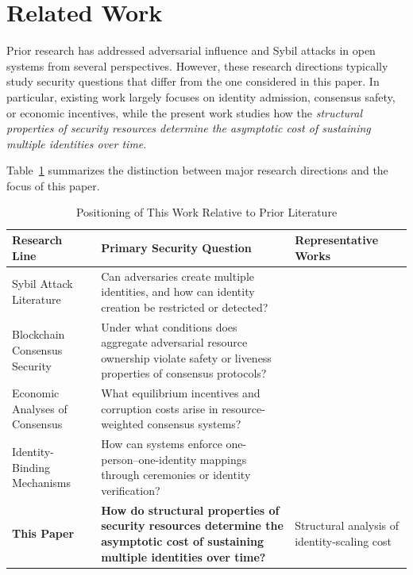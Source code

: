 \documentclass[journal]{IEEEtran}
\begin{document}
	\section{Related Work}
	
	Prior research has addressed adversarial influence and Sybil attacks
	in open systems from several perspectives.
	However, these research directions typically study security questions
	that differ from the one considered in this paper.
	In particular, existing work largely focuses on
	identity admission, consensus safety, or economic incentives,
	while the present work studies how the
	\emph{structural properties of security resources determine
		the asymptotic cost of sustaining multiple identities over time}.
	
	Table~\ref{tab:related_positioning} summarizes the distinction
	between major research directions and the focus of this paper.
	
	\begin{table}[t]
		\centering
		\caption{Positioning of This Work Relative to Prior Literature}
		\label{tab:related_positioning}
		
		\begin{tabular}{p{3.2cm}p{4.6cm}p{5.2cm}}
			\toprule
			\textbf{Research Line} & \textbf{Primary Security Question} & \textbf{Representative Works} \\
			\midrule
			
			Sybil Attack Literature &
			Can adversaries create multiple identities, and how can identity
			creation be restricted or detected? &
			\cite{douceur2002sybil,yu2006sybilguard,yu2008sybillimit,danezis2009sybilinfer,wang2019attack,lesniewski2020analysis} \\
			
			Blockchain Consensus Security &
			Under what conditions does aggregate adversarial resource ownership
			violate safety or liveness properties of consensus protocols? &
			\cite{garay2015backbone,ren2019nakamoto,pass2017hybrid,kiayias2017ouroboros,pass2017fruitchains,eyal2018bitcoinng} \\
			
			Economic Analyses of Consensus &
			What equilibrium incentives and corruption costs arise in
			resource-weighted consensus systems? &
			\cite{budish2018economic,budish2024economic,kroll2013economics,rosenfeld2014analysis,tramer2020slush}\\
			
			Identity-Binding Mechanisms &
			How can systems enforce one-person--one-identity mappings
			through ceremonies or identity verification? &
			\cite{borge2017pop,ford2020pseudonym} \\
			
			\textbf{This Paper} &
			\textbf{How do structural properties of security resources determine
				the asymptotic cost of sustaining multiple identities over time?} &
			Structural analysis of identity-scaling cost \\
			
			\bottomrule
		\end{tabular}
	\end{table}
	
\end{document}

